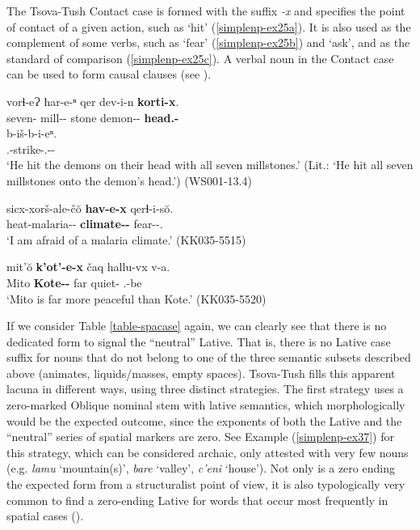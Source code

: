 The Tsova-Tush Contact case is formed with the suffix \textit{-x} and specifies the point of contact of a given action, such as `hit' (\ref{simplenp-ex25a}). It is also used as the complement of some verbs, such as `fear' (\ref{simplenp-ex25b}) and `ask', and as the standard of comparison (\ref{simplenp-ex25c}). A verbal noun in the Contact case can be used to form causal clauses (see ).

\begin{exe}
	\ex\label{simplenp-ex25}
	\begin{xlist}
		
		
			\ex\label{simplenp-ex25a}
			\gll vorɬ-eɁ ħar-e-ⁿ qer dev-i-n \textbf{korti-x}.  \\
			seven-{\Incl} mill-{\Obl}-{\Gen} stone demon-{\Pl}-{\Dat} \textbf{head.{\Obl}-{\Cont}}\\
			\gll b-iš-b-i-eⁿ. \\
			{\B}.{\Sg}-strike-{\B}.{\Sg}-{\Tr}-{\Aor} \\
			\trans `He hit the demons on their head with all seven millstones.' (Lit.: `He hit all seven millstones onto the demon's head.')
			\hfill (WS001-13.4)
		
		
		   
			\ex\label{simplenp-ex25b}
			\gll sicx-xorš-ale-č\u{o} \textbf{hav-e-x} qerɬ-i-s\u{o}. \\
			heat-malaria-{\Adjz}-{\Obl} \textbf{climate-{\Obl}-{\Cont}} fear-{\Npst}-{\Fsg}.{\Nom} \\
			\trans `I am afraid of a malaria climate.'
			\hfill (KK035-5515)
		
		
		   
			\ex\label{simplenp-ex25c}    
			\gll mit'\u{o} \textbf{k'ot'-e-x} čaq hallu-vx v-a. \\
			Mito \textbf{Kote-{\Obl}-{\Cont}} far quiet-{\Cmp} {\M}.{\Sg}-be \\
			\trans `Mito is far more peaceful than Kote.'
			\hfill (KK035-5520)
		
		
		
	\end{xlist}
\end{exe}


If we consider Table \ref{table-spacase} again, we can clearly see that there is no dedicated form to signal the ``neutral'' Lative. That is, there is no Lative case suffix for nouns that do not belong to one of the three semantic subsets described above (animates, liquids/masses, empty spaces). Tsova-Tush fills this apparent lacuna in different ways, using three distinct strategies.  The first strategy uses a zero-marked Oblique nominal stem with lative semantics, which morphologically would be the expected outcome, since the exponents of both the Lative and the ``neutral'' series of spatial markers are zero. See Example (\ref{simplenp-ex37}) for this strategy, which can be considered archaic, only attested with very few nouns (e.g. \textit{lamu} `mountain(s)', \textit{bare} `valley', \textit{c'eni} `house'). Not only is a zero ending the expected form from a structuralist point of view, it is also typologically very common to find a zero-ending Lative for words that occur most frequently in spatial cases (\cite{haspeltmath2019dpm}).

